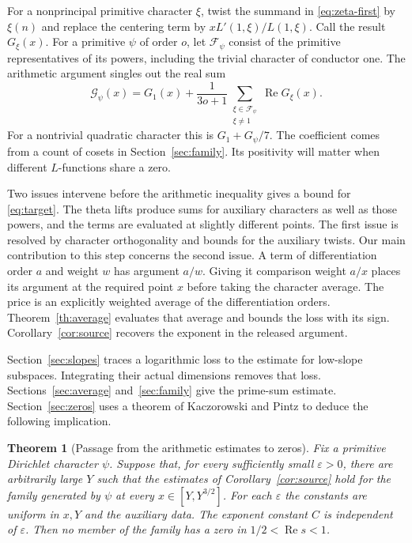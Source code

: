 \documentclass[11pt,letterpaper]{article}
\newcommand{\eps}{\varepsilon}
\newcommand{\Rea}{\operatorname{Re}}
\newtheorem{theorem}{Theorem}[section]
\numberwithin{equation}{section}
\begin{document}
For a nonprincipal primitive character \(\xi\), twist the summand in \eqref{eq:zeta-first} by \(\xi(n)\) and replace the centering term by \(xL'(1,\xi)/L(1,\xi)\). Call the result \(G_\xi(x)\). For a primitive \(\psi\) of order \(o\), let \(\mathcal F_\psi\) consist of the primitive representatives of its powers, including the trivial character of conductor one. The arithmetic argument singles out the real sum
\begin{equation}\label{eq:target}
  \mathcal G_\psi(x)=G_1(x)+
   \frac{1}{3o+1}\sum_{\substack{\xi\in\mathcal F_\psi\\ \xi\ne1}}\Rea G_\xi(x).
\end{equation}
For a nontrivial quadratic character this is \(G_1+G_\psi/7\). The coefficient comes from a count of cosets in Section~\ref{sec:family}. Its positivity will matter when different \(L\)-functions share a zero.

Two issues intervene before the arithmetic inequality gives a bound for \eqref{eq:target}. The theta lifts produce sums for auxiliary characters as well as those powers, and the terms are evaluated at slightly different points. The first issue is resolved by character orthogonality and bounds for the auxiliary twists. Our main contribution to this step concerns the second issue. A term of differentiation order \(a\) and weight \(w\) has argument \(a/w\). Giving it comparison weight \(a/x\) places its argument at the required point \(x\) before taking the character average. The price is an explicitly weighted average of the differentiation orders. Theorem~\ref{th:average} evaluates that average and bounds the loss with its sign. Corollary~\ref{cor:source} recovers the exponent in the released argument.

Section~\ref{sec:slopes} traces a logarithmic loss to the estimate for low-slope subspaces. Integrating their actual dimensions removes that loss. Sections~\ref{sec:average} and~\ref{sec:family} give the prime-sum estimate. Section~\ref{sec:zeros} uses a theorem of Kaczorowski and Pintz to deduce the following implication.

\begin{theorem}[Passage from the arithmetic estimates to zeros]\label{th:chain}
Fix a primitive Dirichlet character \(\psi\). Suppose that, for every sufficiently small \(\eps>0\), there are arbitrarily large \(Y\) such that the estimates of Corollary~\ref{cor:source} hold for the family generated by \(\psi\) at every \(x\in[Y,Y^{3/2}]\). For each \(\eps\) the constants are uniform in \(x,Y\) and the auxiliary data. The exponent constant \(C\) is independent of \(\eps\). Then no member of the family has a zero in \(1/2<\Rea s<1\).
\end{theorem}
\end{document}
